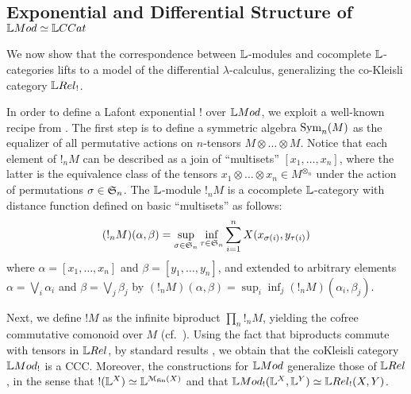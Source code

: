 



\subsection{Exponential and Differential Structure of $\Mod\simeq\GMet$}

We now show that the correspondence between $\mathbb{L}$-modules and cocomplete $\mathbb{L}$-categories lifts to a model of the differential $\lambda$-calculus, generalizing the co-Kleisli category $\LREL_{!}$. 

In order to define a Lafont exponential $!$ over $\Mod$, we exploit a well-known recipe from \cite{Mellies2018, Manzo2013}.
The first step is to define a symmetric algebra $\mathrm{Sym}_{n}(M)$ as the equalizer of all permutative actions on $n$-tensors $M\otimes \dots \otimes M$.
Notice that each element of $!_{n}M$ can be described as a join of ``multisets''
$[x_{1},\dots, x_{n}]$, where the latter is the equivalence class of the tensors 
$x_{1}\otimes \dots \otimes x_{n}\in M^{\otimes_{n}}$ under the action of permutations $\sigma\in \mathfrak{S}_{n}$.
The $\mathbb{L}$-module $!_{n}M$ is a cocomplete $\mathbb{L}$-category with distance function defined on basic ``multisets'' as follows:
\begin{align}
(!_{n}M)(\alpha,\beta)=
\sup_{\sigma\in \mathfrak{S}_{n}}\inf_{\tau\in \mathfrak{S}_{n}}\sum_{i=1}^{n}
X(x_{\sigma(i)},y_{\tau(i)})
\end{align}
where $\alpha=[x_{1},\dots, x_{n}]$ and $\beta= [y_{1},\dots, y_{n}]$, and extended to arbitrary elements $\alpha=\bigvee_{i}\alpha_{i}$ and $\beta=\bigvee_{j}\beta_{j}$
by $(!_{n}M)(\alpha,\beta)=\sup_{i}\inf_{j}(!_{n}M)(\alpha_{i},\beta_{j})$. 


 
Next, we define $!M$ as the infinite biproduct $\prod_{n}!_{n}M$, yielding the cofree commutative comonoid over $M$ (cf.~\cite[Proposition 1]{Mellies2018}).
Using the fact that biproducts commute with tensors in $\LREL$, by standard results \cite{Mellies2018}, we obtain that the coKleisli category $\Mod_{!}$ is a CCC.
Moreover, the constructions for $\Mod$ generalize those of $\LREL$, in the sense that $!(\mathbb{L}^{X})\simeq \mathbb{L}^{\mathcal{M}_{\mathrm{fin}}(X)}$ and that $\Mod_{!}(\Lawv^{X},\Lawv^{Y})\simeq \LREL_{!}(X,Y)$.

